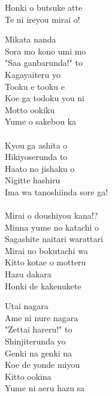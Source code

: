 \def\songtitle{Mirai no Bokura wa Shitteru yo}
\def\songcomment{Season 2 Opening Theme}
\def\songlyrics{Aki Hata}
\def\songwriter{Hajime Mitsumasu}
\def\songarrange{EFFY}
   
\ifdefined\COMPLETE
\else
	
	
\fi
\thispagestyle{song}

\begin{multicols}{2}
Honki o butsuke atte\\
Te ni ireyou mirai o!\\


Mikata nanda\\
Sora mo kono umi mo\\
"Saa ganbarunda!" to\\
Kagayaiteru yo \\
Tooku e tooku e\\
Koe ga todoku you ni\\
Motto ookiku\\
Yume o sakebou ka\\

\\
Kyou ga ashita o\\
Hikiyoserunda to\\
Haato no jishaku o\\
Nigitte hashiru\\
Ima wa tanoshiinda sore ga!\\
\\

Mirai o doushiyou kana!?\\
Minna yume no katachi o\\
Sagashite naitari warattari\\
Mirai no bokutachi wa\\
Kitto kotae o motteru\\
Hazu dakara\\
Honki de kakenukete\\


Utai nagara\\
Ame ni nure nagara\\
"Zettai hareru!" to\\
Shinjiterunda yo \\
Genki na genki na\\
Koe de yonde miyou\\
Kitto ookina\\
Yume ni aeru hazu sa\columnbreak


\end{multicols}

